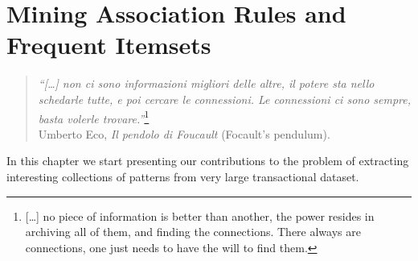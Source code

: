 \chapter[Mining Association Rules and Frequent Itemsets]{Mining Association
Rules and Frequent Itemsets\protect{}}\label{ch:vcmine}

\begin{quote}
  \begin{flushright}
    {\em ``[\ldots] non ci sono informazioni migliori delle altre, il potere sta
    nello schedarle tutte, e poi cercare le connessioni. Le connessioni ci sono
    sempre, basta volerle trovare.''}\footnote{[\ldots] no piece of
    information is better than another, the power resides in archiving all of them,
    and finding the connections. There always are connections, one just needs to
    have the will to find them.}\\
    Umberto Eco, {\em Il pendolo di Foucault} (Focault's pendulum).
  \end{flushright}
\end{quote}

In this chapter we start presenting our contributions to the problem of
extracting interesting collections of patterns from very large transactional
dataset.

